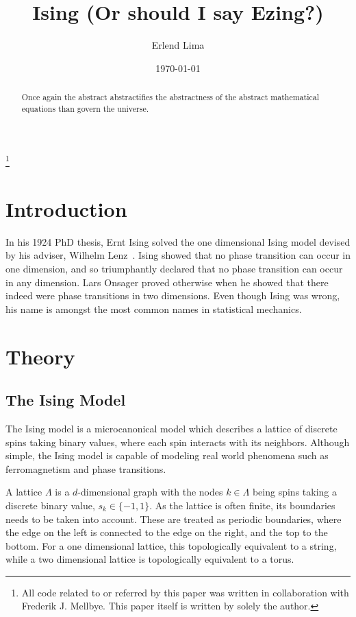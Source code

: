 \documentclass[aps,reprint]{revtex4-1}
\begin{document}
\title{Ising (Or should I say Ezing?)}
\author{Erlend Lima}
\thanks{All code related to or referred by this paper was written in
  collaboration with Frederik J. Mellbye. This paper itself is written by
 solely the author.}
\date{\today}

\begin{abstract}
Once again the abstract abstractifies the abstractness of the abstract mathematical
equations than govern the universe.
\end{abstract}
\maketitle
\tableofcontents
\makeatletter
\let\toc@pre\relax
\let\toc@post\relax
\makeatother

\newpage

\section{Introduction}
\label{sec:introduction}

In his 1924 PhD thesis, Ernt Ising 
solved the one dimensional Ising model devised by his adviser, Wilhelm
Lenz~\cite{weicai}. Ising showed that no phase transition can occur in one
dimension, and so triumphantly declared that no phase transition can occur in
any dimension. Lars Onsager proved otherwise when he showed that there indeed
were phase transitions in two dimensions. Even though Ising was wrong, his name
is amongst the most common names in statistical mechanics. 
\section{Theory}
\label{sec:theory}

\subsection{The Ising Model}
\label{sec:isingmodel}

The Ising model is a microcanonical model which describes a lattice of discrete spins taking binary values, where each
spin interacts with its neighbors. Although simple, the Ising model is capable of modeling real
world phenomena such as ferromagnetism and phase transitions.

A lattice \(\Lambda\) is a \(d\)-dimensional graph with the nodes \(k\in\Lambda\) being spins
taking a discrete binary value, \(s_{k}\in\{-1, 1\}\). As the lattice is often
finite, its boundaries needs to be taken into account. These are treated as
periodic boundaries, where the edge on the left is connected to the edge on the
right, and the top to the bottom. For a one dimensional lattice, this topologically equivalent
to a string, while a two dimensional lattice is topologically equivalent to a torus.
\end{document}
